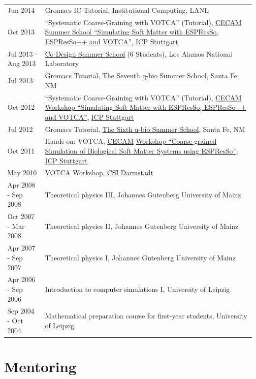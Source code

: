 \documentclass{article}
\begin{document}
\begin{longtable}{p{}p{}}
Jun 2014 & Gromacs IC Tutorial, Institutional Computing, LANL \\
Oct 2013 & ``Systematic Coarse-Graining with VOTCA'' (Tutorial), \href{http://www.cecam.org}{CECAM} \href{http://espressomd.org/wordpress/ess2013/}{Summer School ``Simulating Soft Matter with ESPResSo, ESPResSo++ and VOTCA''}, \href{http://www.icp.uni-stuttgart.de/}{ICP Stuttgart} \\
Jul 2013 - Aug 2013 & \href{http://codesign.lanl.gov}{Co-Design Summer School} (6 Students), Los Alamos National Laboratory \\
Jul 2013 & Gromacs Tutorial, \href{http://q-bio.org/wiki/The\_Seventh\_q-bio\_Summer\_School:\_Biomolecular\_Simulations}{The Seventh q-bio Summer School}, Santa Fe, NM \\
Oct 2012 & ``Systematic Coarse-Graining with VOTCA'' (Tutorial), \href{http://www.cecam.org}{CECAM} \href{http://espressomd.org/wordpress/ess2012/}{Workshop ``Simulating Soft Matter with ESPResSo, ESPResSo++ and VOTCA''}, \href{http://www.icp.uni-stuttgart.de/}{ICP Stuttgart} \\
Jul 2012 & Gromacs Tutorial, \href{http://cnls.lanl.gov/q-bio/wiki/index.php/The\_Sixth\_q-bio\_Summer\_School:\_Biomolecular\_Simulations}{The Sixth q-bio Summer School}, Santa Fe, NM \\
Oct 2011 & Hands-on: VOTCA, \href{http://www.cecam.org}{CECAM} \href{https://www.cecam.org/workshop-details/797}{Workshop ``Coarse-grained Simulation of Biological Soft Matter Systems using ESPResSo''}, \href{http://www.icp.uni-stuttgart.de/}{ICP Stuttgart} \\
May 2010 & VOTCA Workshop, \href{http://www.csi.tu-darmstadt.de/}{CSI Darmstadt} \\
Apr 2008 - Sep 2008 & Theoretical physics III, Johannes Gutenberg University of Mainz \\
Oct 2007 - Mar 2008 & Theoretical physics II, Johannes Gutenberg University of Mainz \\
Apr 2007 - Sep 2007 & Theoretical physics I, Johannes Gutenberg University of Mainz \\
Apr 2006 - Sep 2006 & Introduction to computer simulations I, University of Leipzig \\
Sep 2004 - Oct 2004 & Mathematical preparation course for first-year students, University of Leipzig \\
\end{longtable}

\section*{Mentoring}
\vspace{-4mm}
\end{document}
